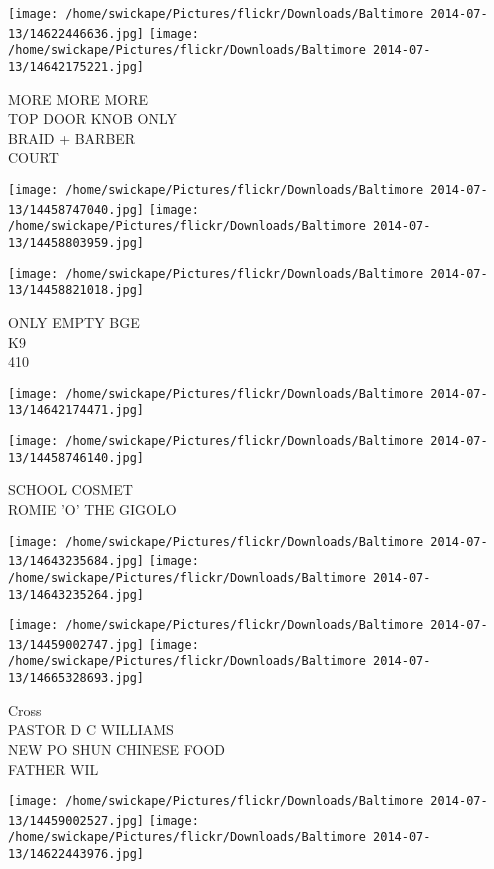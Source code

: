 \documentclass[10pt,letterpaper]{article}
\begin{document}
\texttt{[image: /home/swickape/Pictures/flickr/Downloads/Baltimore 2014-07-13/14622446636.jpg]}
\texttt{[image: /home/swickape/Pictures/flickr/Downloads/Baltimore 2014-07-13/14642175221.jpg]}

MORE MORE MORE\\
TOP DOOR KNOB ONLY\\
BRAID + BARBER\\
COURT
\pagebreak

\texttt{[image: /home/swickape/Pictures/flickr/Downloads/Baltimore 2014-07-13/14458747040.jpg]}
\texttt{[image: /home/swickape/Pictures/flickr/Downloads/Baltimore 2014-07-13/14458803959.jpg]}

\texttt{[image: /home/swickape/Pictures/flickr/Downloads/Baltimore 2014-07-13/14458821018.jpg]}

ONLY EMPTY BGE\\
K9\\
410
\pagebreak

\texttt{[image: /home/swickape/Pictures/flickr/Downloads/Baltimore 2014-07-13/14642174471.jpg]}

\vspace{0.25in}
\texttt{[image: /home/swickape/Pictures/flickr/Downloads/Baltimore 2014-07-13/14458746140.jpg]}

SCHOOL COSMET\\
ROMIE 'O' THE GIGOLO
\pagebreak

\texttt{[image: /home/swickape/Pictures/flickr/Downloads/Baltimore 2014-07-13/14643235684.jpg]}
\texttt{[image: /home/swickape/Pictures/flickr/Downloads/Baltimore 2014-07-13/14643235264.jpg]}

\texttt{[image: /home/swickape/Pictures/flickr/Downloads/Baltimore 2014-07-13/14459002747.jpg]}
\texttt{[image: /home/swickape/Pictures/flickr/Downloads/Baltimore 2014-07-13/14665328693.jpg]}

Cross\\
PASTOR D C WILLIAMS\\
NEW PO SHUN CHINESE FOOD\\
FATHER WIL
\pagebreak

\texttt{[image: /home/swickape/Pictures/flickr/Downloads/Baltimore 2014-07-13/14459002527.jpg]}
\texttt{[image: /home/swickape/Pictures/flickr/Downloads/Baltimore 2014-07-13/14622443976.jpg]}
\end{document}
